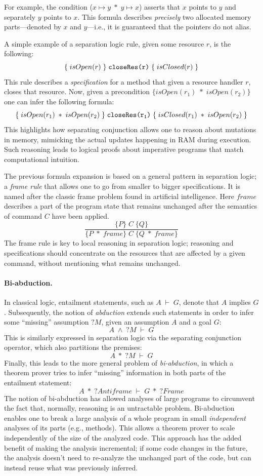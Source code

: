 For example, the condition ($x \mapsto y \; * \; y \mapsto x$) asserts that $x$ points to $y$ and separately $y$ points to $x$. This formula describes \emph{precisely} two allocated memory parts---denoted by $x$ and $y$---i.e., it is guaranteed that the pointers do not alias.

A simple example of a separation logic rule, given some resource $r$, is the following: 
\[
\{ \; isOpen(r) \; \} \; \texttt{closeRes(r)} \; \{ \; isClosed(r) \; \}
\]
This rule describes a \emph{specification} for a method  that given a resource handler $r$, closes that resource. Now, given a precondition $\{isOpen(r_1) \; * \; isOpen(r_2)\}$ one can infer the following formula:
\[
\{ \; isOpen(r_1) \; * \; isOpen(r_2) \; \} \; \texttt{closeRes(r\textsubscript{1})} \; \{ \; isClosed(r_1) \; * \; isOpen(r_2) \; \}
\]
This highlights how separating conjunction allows one to reason about mutations in memory, mimicking the actual updates happening in RAM during execution. Such reasoning leads to logical proofs about imperative programs that match computational intuition.

The previous formula expansion is based on a general pattern in separation logic; a \emph{frame rule} that allows one to go from smaller to bigger specifications. It is named after the classic frame problem found in artificial intelligence. Here $frame$ describes a part of the program state that remains unchanged after the semantics of command $C$ have been applied.
\[
\frac
{\{P\} \; C \;  \{Q\}}
{\{P \; * \; frame \} \; C \;  \{Q \; * \; frame \}}
\]
The frame rule is key to local reasoning in separation logic; reasoning and specifications should concentrate on the resources that are affected by a given command, without mentioning what remains unchanged.

\paragraph{Bi-abduction.}
In classical logic, entailment statements, such as $A \; \vdash \; G$, denote that $A$ implies $G$. Subsequently, the notion of \emph{abduction} extends such statements in order to infer some ``missing'' assumption $?M$, given an assumption $A$ and a goal $G$:
\[
A \; \land \; ?M \; \vdash \; G
\]
This is similarly expressed in separation logic via the separating conjunction operator, which also partitions the premises:
\[
A \; * \; ?M \; \vdash \; G
\]
Finally, this leads to the more general problem of \emph{bi-abduction}, in which a theorem prover tries to infer ``missing'' information in both parts of the entailment statement:
\[
A \; * \; ?Antiframe \; \vdash \; G \; * \; ?Frame
\]
The notion of bi-abduction has allowed analyses of large programs to circumvent the fact that, normally, reasoning is an untractable problem. Bi-abduction enables one to break a large analysis of a whole program in small \emph{independent} analyses of its parts (e.g., methods). This allows a theorem prover to scale independently of the size of the analyzed code. This approach has the added benefit of making the analysis incremental; if some code changes in the future, the analysis doesn't need to re-analyze the unchanged part of the code, but can instead reuse what was previously inferred.



